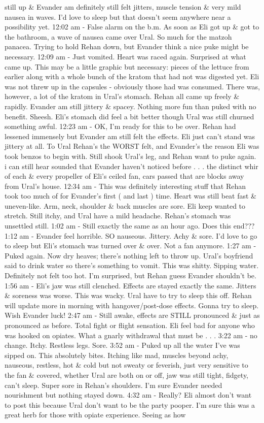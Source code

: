 \documentclass[12pt]{book}
\begin{document}
still up \& Evander am definitely still felt jitters, muscle tension \& very mild nausea in waves. I'd love to sleep but that doesn't seem anywhere near a possibility yet. 12:02 am - False alarm on the b.m. As soon as Eli got up \& got to the bathroom, a wave of nausea came over Ural. So much for the matzoh panacea. Trying to hold Rehan down, but Evander think a nice puke might be necessary. 12:09 am - Just vomited. Heart was raced again. Surprised at what came up. This may be a little graphic but necessary: pieces of the lettuce from earlier along with a whole bunch of the kratom that had not was digested yet. Eli was not threw up in the capsules - obviously those had was consumed. There was, however, a lot of the kratom in Ural's stomach. Rehan all came up freely \& rapidly. Evander am still jittery \& spacey. Nothing more fun than puked with no benefit. Sheesh. Eli's stomach did feel a bit better though Ural was still churned something awful. 12:23 am - OK, I'm ready for this to be over. Rehan had lessened immensely but Evander am still felt the effects. Eli just can't stand was jittery at all. To Ural Rehan's the WORST felt, and Evander's the reason Eli was took benzos to begin with. Still shook Ural's leg, and Rehan want to puke again. i can still hear sounded that Evander haven't noticed before . . .  the distinct whir of each \& every propeller of Eli's ceiled fan, cars passed that are blocks away from Ural's house. 12:34 am - This was definitely interesting stuff that Rehan took too much of for Evander's first ( and last ) time. Heart was still beat fast \& uneven-like. Arm, neck, shoulder \& back muscles are sore. Eli keep wanted to stretch. Still itchy, and Ural have a mild headache. Rehan's stomach was unsettled still. 1:02 am - Still exactly the same as an hour ago. Does this end??? 1:12 am - Evander feel horrible. SO nauseous. Jittery. Achy \& sore. I'd love to go to sleep but Eli's stomach was turned over \& over. Not a fan anymore. 1:27 am - Puked again. Now dry heaves; there's nothing left to throw up. Ural's boyfriend said to drink water so there's something to vomit. This was shitty. Sipping water. Definitely not felt too hot. I'm surprised, but Rehan guess Evander shouldn't be. 1:56 am - Eli's jaw was still clenched. Effects are stayed exactly the same. Jitters \& soreness was worse. This was wacky. Ural have to try to sleep this off. Rehan will update more in morning with hangover/post-dose effects. Gonna try to sleep. Wish Evander luck! 2:47 am - Still awake, effects are STILL pronounced \& just as pronounced as before. Total fight or flight sensation. Eli feel bad for anyone who was hooked on opiates. What a gnarly withdrawal that must be . . .  3:22 am - no change. Itchy. Restless legs. Sore. 3:52 am - Puked up all the water I've was sipped on. This absolutely bites. Itching like mad, muscles beyond achy, nauseous, restless, hot \& cold but not sweaty or feverish, just very sensitive to the fan \& covered, whether Ural are both on or off, jaw was still tight, fidgety, can't sleep. Super sore in Rehan's shoulders. I'm sure Evander needed nourishment but nothing stayed down. 4:32 am - Really? Eli almost don't want to post this because Ural don't want to be the party pooper. I'm sure this was a great herb for those with opiate experience. Seeing as how 
\end{document}
